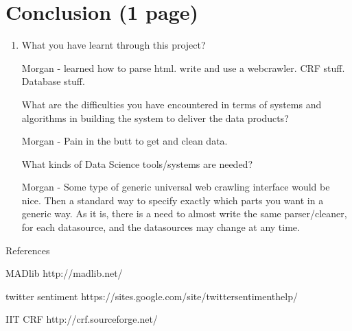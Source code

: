 \documentclass{article}
\begin{document}
\begin{enumerate}
\begin{enumerate}
  \end{enumerate}

  \section{Conclusion (1 page)}
  \begin{enumerate}\item What you have learnt through this project?

    Morgan - learned how to parse html. write and use a webcrawler. CRF stuff. Database stuff.

    What are the difficulties you have encountered in terms of systems and algorithms in building the system to deliver the data products?

    Morgan - Pain in the butt to get and clean data.

    What kinds of Data Science tools/systems are needed?

    Morgan -
    Some type of generic universal web crawling interface would be nice.
    Then a standard way to specify exactly which parts you want in a generic way.
    As it is, there is a need to almost write the same parser/cleaner, for each datasource, and the datasources may change at any time.


  \end{enumerate}
\end{enumerate}

References

MADlib http://madlib.net/

twitter sentiment https://sites.google.com/site/twittersentimenthelp/

IIT CRF http://crf.sourceforge.net/
\end{document}
